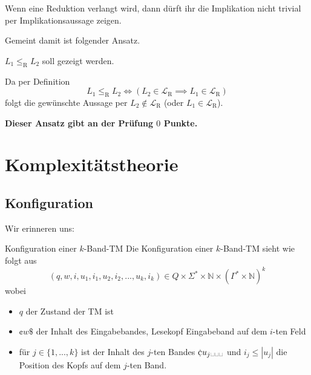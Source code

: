 \documentclass[a4paper, 11pt]{article}
\def\N{\mathbb{N}}
\def\Lr{\mathcal{L}_\text{R}}
\begin{document}
                            Wenn eine Reduktion verlangt wird, dann dürft ihr die Implikation nicht trivial per Implikationsaussage zeigen.
                                
                            Gemeint damit ist folgender Ansatz. 
                        
                                $L_1 \leq_{\text{R}} L_2$ soll gezeigt werden. 
                            
                                    
                                Da per Definition 
                                $$L_1 \leq_{\text{R}} L_2 \iff (L_2 \in \Lr \implies L_1 \in \Lr)$$
                                folgt die gewünschte Aussage per $L_2 \notin \Lr$ (oder $L_1 \in \Lr$). 
                        
                                \textbf{Dieser Ansatz gibt an der Prüfung $0$ Punkte.}
                       
                        
                        \section{Komplexitätstheorie}
                        
                        \subsection{Konfiguration}

                            Wir erinneren uns:
                            \begin{mainbox}{Konfiguration einer $k$-Band-TM}
                                Die Konfiguration einer $k$-Band-TM sieht wie folgt aus
                                $$(q, w, i, u_1, i_1, u_2, i_2, ..., u_k, i_k) \in Q \times \Sigma^* \times \N \times (\Gamma^* \times \N)^k$$
                                wobei 
                                \begin{itemize}[label = $\blacktriangleright$]
                                    
                                    \item $q$ der Zustand der TM ist
                                    
                                    \item $\cent w \$$ der Inhalt des Eingabebandes, Lesekopf Eingabeband auf dem $i$-ten Feld
                                    
                                    \item für $j \in \{1, ..., k\}$ ist der Inhalt des $j$-ten Bandes $\cent u_j \text{\textvisiblespace \textvisiblespace \textvisiblespace}$ und $i_j \leq |u_j|$ die Position des Kopfs auf dem $j$-ten Band. 
                                \end{itemize}
                            \end{mainbox}
\end{document}

